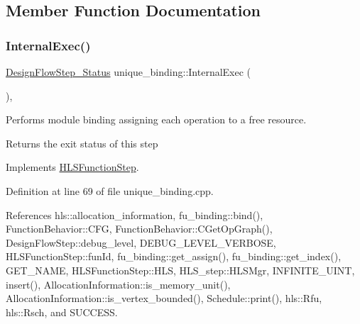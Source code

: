 \subsection{Member Function Documentation}
\mbox{\label{classunique__binding_a7d59ec7a2432423cb1e29fe246f73032}} 
\subsubsection{\texorpdfstring{Internal\+Exec()}{InternalExec()}}
{\footnotesize\ttfamily \hyperlink{design__flow__step_8hpp_afb1f0d73069c26076b8d31dbc8ebecdf}{Design\+Flow\+Step\+\_\+\+Status} unique\+\_\+binding\+::\+Internal\+Exec (\begin{DoxyParamCaption}{ }\end{DoxyParamCaption})\hspace{0.3cm}{\ttfamily [override]}, {\ttfamily [virtual]}}



Performs module binding assigning each operation to a free resource. 

\begin{DoxyReturn}{Returns}
the exit status of this step 
\end{DoxyReturn}


Implements \hyperlink{classHLSFunctionStep_a8db4c00d080655984d98143206fc9fa8}{H\+L\+S\+Function\+Step}.



Definition at line 69 of file unique\+\_\+binding.\+cpp.



References hls\+::allocation\+\_\+information, fu\+\_\+binding\+::bind(), Function\+Behavior\+::\+C\+FG, Function\+Behavior\+::\+C\+Get\+Op\+Graph(), Design\+Flow\+Step\+::debug\+\_\+level, D\+E\+B\+U\+G\+\_\+\+L\+E\+V\+E\+L\+\_\+\+V\+E\+R\+B\+O\+SE, H\+L\+S\+Function\+Step\+::fun\+Id, fu\+\_\+binding\+::get\+\_\+assign(), fu\+\_\+binding\+::get\+\_\+index(), G\+E\+T\+\_\+\+N\+A\+ME, H\+L\+S\+Function\+Step\+::\+H\+LS, H\+L\+S\+\_\+step\+::\+H\+L\+S\+Mgr, I\+N\+F\+I\+N\+I\+T\+E\+\_\+\+U\+I\+NT, insert(), Allocation\+Information\+::is\+\_\+memory\+\_\+unit(), Allocation\+Information\+::is\+\_\+vertex\+\_\+bounded(), Schedule\+::print(), hls\+::\+Rfu, hls\+::\+Rsch, and S\+U\+C\+C\+E\+SS.

